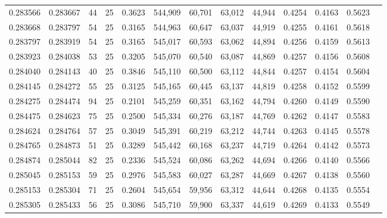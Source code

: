 \begin{tabular}{rrrrrrrrrrrrr}
0.283566 & 0.283667 &    44 &  25 &                                     0.3623 & 544,909 &  60,701 &  63,012 &  44,944 & 0.4254 & 0.4163 & 0.5623 \\
0.283668 & 0.283797 &    54 &  25 &                                     0.3165 & 544,963 &  60,647 &  63,037 &  44,919 & 0.4255 & 0.4161 & 0.5618 \\
0.283797 & 0.283919 &    54 &  25 &                                     0.3165 & 545,017 &  60,593 &  63,062 &  44,894 & 0.4256 & 0.4159 & 0.5613 \\
0.283923 & 0.284038 &    53 &  25 &                                     0.3205 & 545,070 &  60,540 &  63,087 &  44,869 & 0.4257 & 0.4156 & 0.5608 \\
0.284040 & 0.284143 &    40 &  25 &                                     0.3846 & 545,110 &  60,500 &  63,112 &  44,844 & 0.4257 & 0.4154 & 0.5604 \\
0.284145 & 0.284272 &    55 &  25 &                                     0.3125 & 545,165 &  60,445 &  63,137 &  44,819 & 0.4258 & 0.4152 & 0.5599 \\
0.284275 & 0.284474 &    94 &  25 &                                     0.2101 & 545,259 &  60,351 &  63,162 &  44,794 & 0.4260 & 0.4149 & 0.5590 \\
0.284475 & 0.284623 &    75 &  25 &                                     0.2500 & 545,334 &  60,276 &  63,187 &  44,769 & 0.4262 & 0.4147 & 0.5583 \\
0.284624 & 0.284764 &    57 &  25 &                                     0.3049 & 545,391 &  60,219 &  63,212 &  44,744 & 0.4263 & 0.4145 & 0.5578 \\
0.284765 & 0.284873 &    51 &  25 &                                     0.3289 & 545,442 &  60,168 &  63,237 &  44,719 & 0.4264 & 0.4142 & 0.5573 \\
0.284874 & 0.285044 &    82 &  25 &                                     0.2336 & 545,524 &  60,086 &  63,262 &  44,694 & 0.4266 & 0.4140 & 0.5566 \\
0.285045 & 0.285153 &    59 &  25 &                                     0.2976 & 545,583 &  60,027 &  63,287 &  44,669 & 0.4267 & 0.4138 & 0.5560 \\
0.285153 & 0.285304 &    71 &  25 &                                     0.2604 & 545,654 &  59,956 &  63,312 &  44,644 & 0.4268 & 0.4135 & 0.5554 \\
0.285305 & 0.285433 &    56 &  25 &                                     0.3086 & 545,710 &  59,900 &  63,337 &  44,619 & 0.4269 & 0.4133 & 0.5549 \\

\end{tabular}
